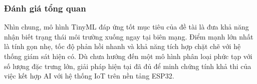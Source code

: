 \subsubsection{Đánh giá tổng quan}
Nhìn chung, mô hình TinyML đáp ứng tốt mục tiêu của đề tài là đưa khả năng nhận biết trạng thái môi trường xuống ngay tại biên mạng. Điểm mạnh lớn nhất là tính gọn nhẹ, tốc độ phản hồi nhanh và khả năng tích hợp chặt chẽ với hệ thống giám sát hiện có. Dù chưa hướng đến một mô hình phân loại phức tạp với số lượng đặc trưng lớn, giải pháp hiện tại đã đủ để minh chứng tính khả thi của việc kết hợp AI với hệ thống IoT trên nền tảng ESP32.